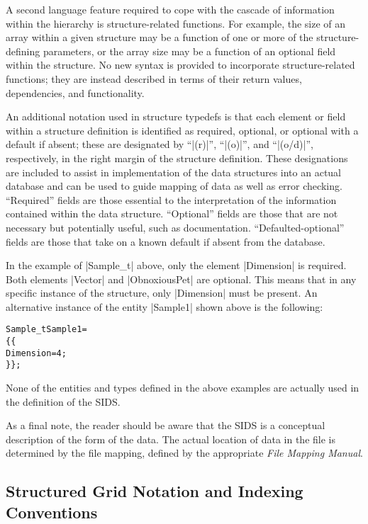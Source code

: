 {{{A second language feature required to cope with the cascade of information
within the hierarchy is structure-related functions.  For example, the size
of an array within a given structure may be a function of one or more of the
structure-defining parameters, or the array size may be a function of an
optional field within the structure.  No new syntax is provided to
incorporate structure-related functions; they are instead described in terms
of their return values, dependencies, and functionality.

An additional notation used in structure typedefs is that each element or
field within a structure definition is identified as required, optional, or
optional with a default if absent; these are designated by ``|(r)|'', ``|(o)|'',
and ``|(o/d)|'', respectively, in the right margin of the structure
definition.  These designations are included to assist in implementation of
the data structures into an actual database and can be used to guide mapping
of data as well as error checking.  ``Required'' fields are those essential to
the interpretation of the information contained within the data structure.
``Optional'' fields are those that are not necessary but potentially useful,
such as documentation.  ``Defaulted-optional'' fields are those that take on a
known default if absent from the database.

In the example of |Sample_t| above, only the element |Dimension| is
required.  Both elements |Vector| and |ObnoxiousPet| are optional.  This
means that in any specific instance of the structure, only |Dimension|
must be present.  An alternative instance of the entity |Sample1| shown
above is the following:
\begin{alltt}
  Sample\_t Sample1 = 
    \{\{
    Dimension = 4 ;
    \}\} ;
\end{alltt}

None of the entities and types defined in the above examples are actually
used in the definition of the SIDS.

As a final note, the reader should be aware that the SIDS is a 
conceptual description of the form of the data.
The actual location of data in the file is determined by the file
mapping, defined by the appropriate \textit{File Mapping Manual}.

\subsection{Structured Grid Notation and Indexing Conventions} 
\label{s:structgrid}

}}}
